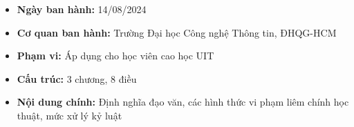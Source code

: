 \begin{itemize}
  \item \textbf{Ngày ban hành:} 14/08/2024
  \item \textbf{Cơ quan ban hành:} Trường Đại học Công nghệ Thông tin, ĐHQG-HCM
  \item \textbf{Phạm vi:} Áp dụng cho học viên cao học UIT
  \item \textbf{Cấu trúc:} 3 chương, 8 điều
  \item \textbf{Nội dung chính:} Định nghĩa đạo văn, các hình thức vi phạm liêm chính học thuật, mức xử lý kỷ luật
\end{itemize}
